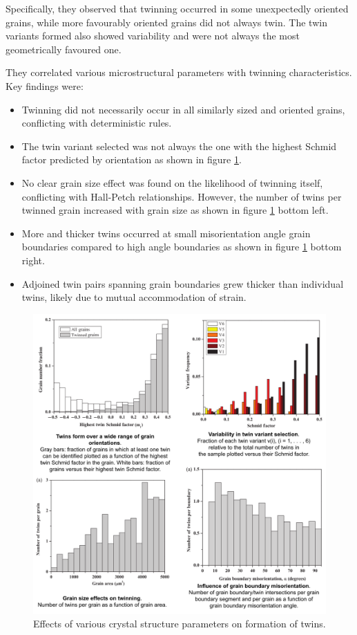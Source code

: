 Specifically, they observed that twinning occurred in some unexpectedly oriented grains, while more favourably oriented grains did not always twin. The twin variants formed also showed variability and were not always the most geometrically favoured one.

They correlated various microstructural parameters with twinning characteristics. Key findings were:
\begin{itemize}
\item Twinning did not necessarily occur in all similarly sized and oriented grains, conflicting with deterministic rules.
\item The twin variant selected was not always the one with the highest Schmid factor predicted by orientation as shown in figure \ref{fig:8.2}.
\item No clear grain size effect was found on the likelihood of twinning itself, conflicting with Hall-Petch relationships. However, the number of twins per twinned grain increased with grain size as shown in figure \ref{fig:8.2} bottom left.
\item More and thicker twins occurred at small misorientation angle grain boundaries compared to high angle boundaries as shown in figure \ref{fig:8.2} bottom right.
\item Adjoined twin pairs spanning grain boundaries grew thicker than individual twins, likely due to mutual accommodation of strain.
\end{itemize}

\begin{figure}[H]
    \centering
    \includegraphics[width=\textwidth]{images/IB02.png}
    \caption{Effects of various crystal structure parameters on formation of twins.}
    \label{fig:8.2}
\end{figure}



